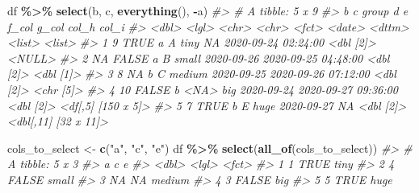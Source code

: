 \documentclass[
]{report}
\newenvironment{Shaded}{\begin{snugshade}}{\end{snugshade}}
\newcommand{\CommentTok}[1]{\textcolor[rgb]{0.56,0.35,0.01}{\textit{#1}}}
\newcommand{\KeywordTok}[1]{\textcolor[rgb]{0.13,0.29,0.53}{\textbf{#1}}}
\newcommand{\NormalTok}[1]{#1}
\newcommand{\OperatorTok}[1]{\textcolor[rgb]{0.81,0.36,0.00}{\textbf{#1}}}
\newcommand{\StringTok}[1]{\textcolor[rgb]{0.31,0.60,0.02}{#1}}
\begin{document}
\begin{Shaded}
\begin{Highlighting}[]
\NormalTok{df }\OperatorTok{\%\textgreater{}\%}
\StringTok{  }\KeywordTok{select}\NormalTok{(b, c, }\KeywordTok{everything}\NormalTok{(), }\OperatorTok{{-}}\NormalTok{a)}
\CommentTok{\#\textgreater{} \# A tibble: 5 x 9}
\CommentTok{\#\textgreater{}       b c     group d     e      f\_col      g\_col               col\_h     col\_i               }
\CommentTok{\#\textgreater{}   \textless{}dbl\textgreater{} \textless{}lgl\textgreater{} \textless{}chr\textgreater{} \textless{}chr\textgreater{} \textless{}fct\textgreater{}  \textless{}date\textgreater{}     \textless{}dttm\textgreater{}              \textless{}list\textgreater{}    \textless{}list\textgreater{}              }
\CommentTok{\#\textgreater{} 1     9 TRUE  a     A     tiny   NA         2020{-}09{-}24 02:24:00 \textless{}dbl [2]\textgreater{} \textless{}NULL\textgreater{}              }
\CommentTok{\#\textgreater{} 2    NA FALSE a     B     small  2020{-}09{-}26 2020{-}09{-}25 04:48:00 \textless{}dbl [2]\textgreater{} \textless{}dbl [1]\textgreater{}           }
\CommentTok{\#\textgreater{} 3     8 NA    b     C     medium 2020{-}09{-}25 2020{-}09{-}26 07:12:00 \textless{}dbl [2]\textgreater{} \textless{}chr [5]\textgreater{}           }
\CommentTok{\#\textgreater{} 4    10 FALSE b     \textless{}NA\textgreater{}  big    2020{-}09{-}24 2020{-}09{-}27 09:36:00 \textless{}dbl [2]\textgreater{} \textless{}df[,5] [150 x 5]\textgreater{}  }
\CommentTok{\#\textgreater{} 5     7 TRUE  b     E     huge   2020{-}09{-}27 NA                  \textless{}dbl [2]\textgreater{} \textless{}dbl[,11] [32 x 11]\textgreater{}}
\end{Highlighting}
\end{Shaded}

\begin{Shaded}
\begin{Highlighting}[]
\NormalTok{cols\_to\_select \textless{}{-}}\StringTok{ }\KeywordTok{c}\NormalTok{(}\StringTok{"a"}\NormalTok{, }\StringTok{"c"}\NormalTok{, }\StringTok{"e"}\NormalTok{)}
\NormalTok{df }\OperatorTok{\%\textgreater{}\%}
\StringTok{  }\KeywordTok{select}\NormalTok{(}\KeywordTok{all\_of}\NormalTok{(cols\_to\_select))}
\CommentTok{\#\textgreater{} \# A tibble: 5 x 3}
\CommentTok{\#\textgreater{}       a c     e     }
\CommentTok{\#\textgreater{}   \textless{}dbl\textgreater{} \textless{}lgl\textgreater{} \textless{}fct\textgreater{} }
\CommentTok{\#\textgreater{} 1     1 TRUE  tiny  }
\CommentTok{\#\textgreater{} 2     4 FALSE small }
\CommentTok{\#\textgreater{} 3    NA NA    medium}
\CommentTok{\#\textgreater{} 4     3 FALSE big   }
\CommentTok{\#\textgreater{} 5     5 TRUE  huge}
\end{Highlighting}
\end{Shaded}
\end{document}
